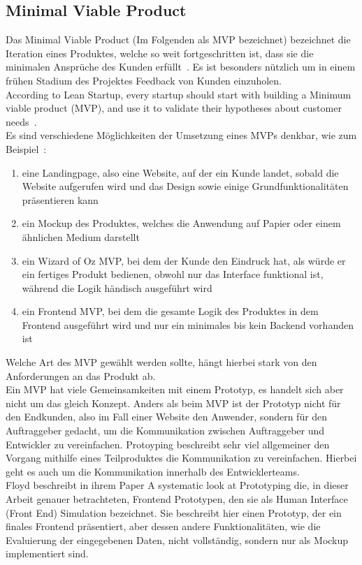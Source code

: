 \subsection{Minimal Viable Product} %
\label{sub:Minimal_Viable_Product}
Das Minimal Viable Product (Im Folgenden als MVP bezeichnet) bezeichnet die Iteration eines Produktes, welche so weit fortgeschritten ist, dass sie die minimalen Ansprüche des Kunden erfüllt~\cite{MVPOriginal}.
Es ist besonders nützlich um in einem frühen Stadium des Projektes Feedback von Kunden einzuholen.\\
\glqq{}According to Lean Startup, every startup should start with building a Minimum viable product (MVP), and use it to validate their hypotheses about customer needs\grqq{}~\cite{MVPodrMFP}.\\
Es sind verschiedene Möglichkeiten der Umsetzung eines MVPs denkbar, wie zum Beispiel~\cite{MVPodrMFP}:

\begin{enumerate}
    \item eine Landingpage, also eine Website, auf der ein Kunde landet, sobald die Website aufgerufen wird und das Design sowie einige Grundfunktionalitäten präsentieren kann
    \item ein Mockup des Produktes, welches die Anwendung auf Papier oder einem ähnlichen Medium darstellt
    \item ein \glqq{}Wizard of Oz\grqq{} MVP, bei dem der Kunde den Eindruck hat, als würde er ein fertiges Produkt bedienen, obwohl nur das Interface funktional ist, während die Logik händisch ausgeführt wird
    \item ein Frontend MVP, bei dem die gesamte Logik des Produktes in dem Frontend ausgeführt wird und nur ein minimales bis kein Backend vorhanden ist
\end{enumerate}

Welche Art des MVP gewählt werden sollte, hängt hierbei stark von den Anforderungen an das Produkt ab.\\

Ein MVP hat viele Gemeinsamkeiten mit einem Prototyp, es handelt sich aber nicht um das gleich Konzept.
Anders als beim MVP ist der Prototyp nicht für den Endkunden, also im Fall einer Website den Anwender, sondern für den Auftraggeber gedacht, um die Kommunikation zwischen Auftraggeber und Entwickler zu vereinfachen.
Protoyping beschreibt sehr viel allgemeiner den Vorgang mithilfe eines Teilproduktes die Kommunikation zu vereinfachen.
Hierbei geht es auch um die Kommunikation innerhalb des Entwicklerteams.~\cite{floyd1984systematic}\\
Floyd beschreibt in ihrem Paper \glq{}A systematic look at Prototyping\grq{} die, in dieser Arbeit genauer betrachteten, Frontend Prototypen, den sie als \glqq{}Human Interface (Front End) Simulation\grqq{} bezeichnet.
Sie beschreibt hier einen Prototyp, der ein finales Frontend präsentiert, aber dessen andere Funktionalitäten, wie die Evaluierung der eingegebenen Daten, nicht vollständig, sondern nur als Mockup implementiert sind.~\cite{floyd1984systematic}


